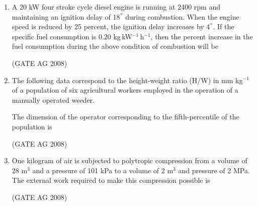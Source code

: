 \documentclass[journal]{IEEEtran}
\begin{document}
\begin{enumerate}
\item 
 A 20 kW four stroke cycle diesel engine is running at 2400 rpm and maintaining an ignition delay of 18$^ \degree$ during combustion. When the engine speed is reduced by 25 percent, the ignition delay increases by 4$^ \degree$. If the specific fuel consumption is 0.20 kg\,kW$^{-1}$\,h$^{-1}$, then the percent increase in the fuel consumption during the above condition of combustion will be
\begin{enumerate}
\end{enumerate}
\hfill(GATE AG 2008)\\

\medskip

\item 
 The following data correspond to the height-weight ratio (H/W) in mm kg$^{-1}$ of a population of six agricultural workers employed in the operation of a manually operated weeder.


The dimension of the operator corresponding to the fifth-percentile of the population is
\begin{enumerate}
\end{enumerate}
\hfill(GATE AG 2008)\\

\medskip

\item 
 One kilogram of air is subjected to polytropic compression from a volume of 28 m$^3$ and a pressure of 101 kPa to a volume of 2 m$^3$ and pressure of 2 MPa. The external work required to make this compression possible is
\begin{enumerate}
\end{enumerate}
\hfill(GATE AG 2008)\\


\end{enumerate}
\end{document}
